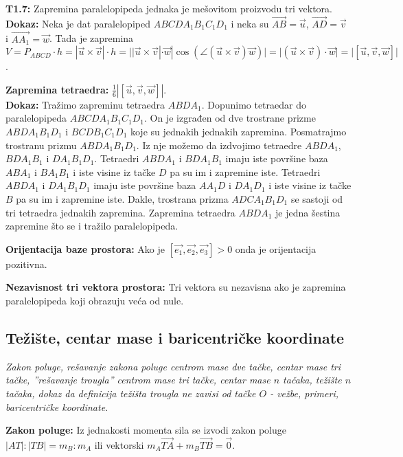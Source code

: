 \documentclass[12pt]{article}
\newcommand{\vek}[1]{\overrightarrow{#1}}
\begin{document}
\textbf{T1.7:} Zapremina paralelopipeda jednaka je mešovitom proizvodu tri
vektora.\\
\textbf{Dokaz:} Neka je dat paralelopiped $ABCDA_1B_1C_1D_1$ i neka su
$\vek{AB}=\vek{u}$, $\vek{AD}=\vek{v}$ i $\vek{AA_1}=\vek{w}$. Tada je
zapremina $V=P_{ABCD}\cdot h=|\vek{u}\times\vek{v}|\cdot h=
    ||\vek{u}\times\vek{v}|\cdot \vek{w}|\cos(\angle{(\vek{u}\times
            \vek{v})\vek{w}})|=|(\vek{u}\times\vek{v}) \cdot \vek{w}|=|[\vek{u},\vek{v},
    \vek{w}]|$.
\par

\textbf{Zapremina tetraedra:} $\frac{1}{6}|[\vek{u},\vek{v},\vek{w}]|$.\\
\textbf{Dokaz:} Tražimo zapreminu tetraedra $ABDA_1$. Dopunimo tetraedar do
paralelopipeda $ABCDA_1B_1C_1D_1$. On je izgrađen od dve trostrane prizme
$ABDA_1B_1D_1$ i $BCDB_1C_1D_1$ koje su jednakih jednakih zapremina.
Posmatrajmo trostranu prizmu $ABDA_1B_1D_1$. Iz nje možemo da izdvojimo
tetraedre $ABDA_1$, $BDA_1B_1$ i $DA_1B_1D_1$. Tetraedri $ABDA_1$ i $BDA_1B_1$
imaju iste površine baza $ABA_1$ i $BA_1B_1$ i iste visine iz tačke $D$ pa su
im i zapremine iste. Tetraedri $ABDA_1$ i $DA_1B_1D_1$ imaju iste površine baza
$AA_1D$ i $DA_1D_1$ i iste visine iz tačke $B$ pa su im i zapremine iste.
Dakle, trostrana prizma $ADCA_1B_1D_1$ se sastoji od tri tetraedra jednakih
zapremina. Zapremina tetraedra $ABDA_1$ je jedna šestina zapremine
što se i tražilo paralelopipeda.
\par

\textbf{Orijentacija baze prostora:} Ako je $[\vek{e_1},\vek{e_2},\vek{e_3}]>0$
onda je orijentacija pozitivna.
\par

\textbf{Nezavisnost tri vektora prostora:} Tri vektora su nezavisna ako je
zapremina paralelopipeda koji obrazuju veća od nule.

\subsection{Težište, centar mase i baricentričke koordinate}
\textit{Zakon poluge, rešavanje zakona poluge centrom mase dve tačke, centar
    mase tri tačke, ”rešavanje trougla” centrom mase tri tačke, centar mase $n$
    tačaka, težište $n$ tačaka, dokaz da definicija težišta trougla ne zavisi od
    tačke $O$ - vežbe, primeri, baricentričke koordinate.}
\par
\vspace*{1cm}

\textbf{Zakon poluge:} Iz jednakosti momenta sila se izvodi zakon poluge
$|AT|:|TB|=m_B:m_A$ ili vektorski $m_A\vek{TA}+m_B\vek{TB}=\vek{0}$.
\par
\end{document}
